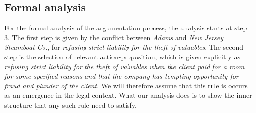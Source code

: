 		\subsection{Formal analysis}
			
		For the formal analysis of the argumentation process, the analysis starts at step 3. The first step is given by the conflict between \textit{Adams} and \textit{New Jersey Steamboat Co.}, for \textit{refusing strict liability for the theft of valuables}. The second step is the selection of relevant action-proposition, which is given explicitly as \textit{refusing strict liability for the theft of valuables when the client paid for a room for some specified reasons and that the company has tempting opportunity for fraud and plunder of the client}. We will therefore assume that this rule is occurs as an emergence in the legal context. What our analysis does is to show the inner structure that any such rule need to satisfy.  
			
